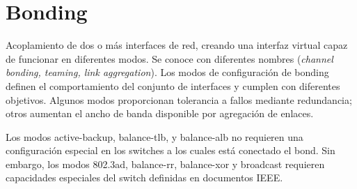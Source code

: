 \section{Bonding}


Acoplamiento de dos o más interfaces de red, creando una interfaz virtual capaz de funcionar en diferentes modos. Se conoce con diferentes nombres (\textit{channel bonding, teaming, link aggregation}). 
Los modos de configuración de bonding definen el comportamiento del conjunto de interfaces y cumplen con diferentes objetivos. Algunos modos proporcionan tolerancia a fallos mediante redundancia; otros aumentan el ancho de banda disponible por agregación de enlaces.

Los modos active-backup, balance-tlb, y balance-alb no requieren una configuración especial en los switches a los cuales está conectado el bond.
Sin embargo, los modos 802.3ad, balance-rr, balance-xor y broadcast requieren capacidades especiales del switch definidas en documentos IEEE.


